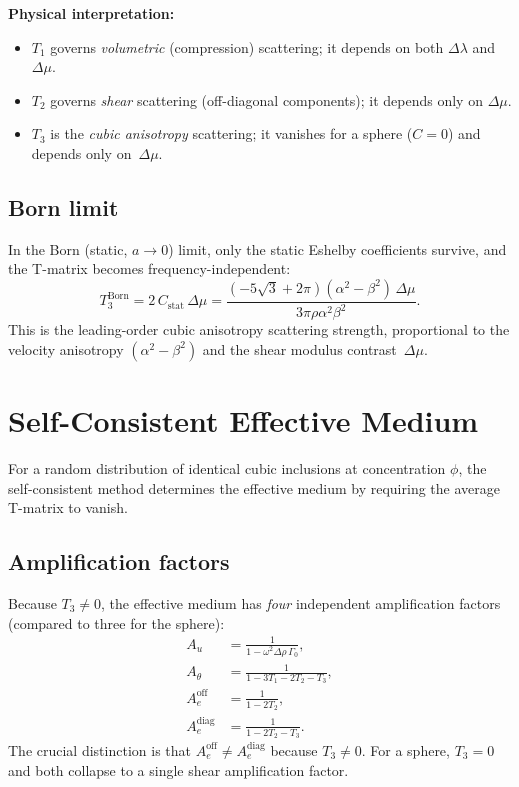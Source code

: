 \documentclass[11pt,a4paper]{article}
\newcommand{\Dlam}{\Delta\lambda}
\newcommand{\Dmu}{\Delta\mu}
\newcommand{\Drho}{\Delta\rho}
\begin{document}
\noindent
\textbf{Physical interpretation:}
\begin{itemize}
  \item $T_1$ governs \emph{volumetric} (compression) scattering;
    it depends on both $\Dlam$ and $\Dmu$.
  \item $T_2$ governs \emph{shear} scattering (off-diagonal
    components); it depends only on $\Dmu$.
  \item $T_3$ is the \emph{cubic anisotropy} scattering; it
    vanishes for a sphere ($C = 0$) and depends only on~$\Dmu$.
\end{itemize}

\subsection{Born limit}

In the Born (static, $a \to 0$) limit, only the static Eshelby
coefficients survive, and the T-matrix becomes frequency-independent:
\begin{equation}
  T_3^\text{Born}
  = 2\,C_\text{stat}\,\Dmu
  = \frac{(-5\sqrt{3} + 2\pi)(\alpha^2 - \beta^2)\,\Dmu}
         {3\pi\rho\alpha^2\beta^2}.
  \label{eq:T3Born}
\end{equation}
This is the leading-order cubic anisotropy scattering strength,
proportional to the velocity anisotropy
$(\alpha^2 - \beta^2)$ and the shear modulus contrast~$\Dmu$.

\section{Self-Consistent Effective Medium}
\label{sec:scm}

For a random distribution of identical cubic inclusions at
concentration $\phi$, the self-consistent method
\citep{ZellerDederichs1973,Willis1981} determines the effective
medium by requiring the average T-matrix to vanish.

\subsection{Amplification factors}

Because $T_3 \neq 0$, the effective medium has \emph{four}
independent amplification factors (compared to three for the
sphere):
\begin{align}
  A_u &= \frac{1}{1 - \omega^2\Drho\,\Gamma_0},
  \label{eq:Au} \\[6pt]
  A_\theta &= \frac{1}{1 - 3T_1 - 2T_2 - T_3},
  \label{eq:Atheta} \\[6pt]
  A_e^\text{off} &= \frac{1}{1 - 2T_2},
  \label{eq:Aeoff} \\[6pt]
  A_e^\text{diag} &= \frac{1}{1 - 2T_2 - T_3}.
  \label{eq:Aediag}
\end{align}
The crucial distinction is that
$A_e^\text{off} \neq A_e^\text{diag}$ because $T_3 \neq 0$.
For a sphere, $T_3 = 0$ and both collapse to a single shear
amplification factor.
\end{document}
